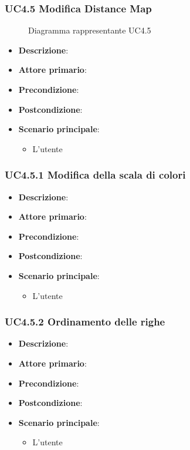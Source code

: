 \newpage
\subsubsection{UC4.5 Modifica Distance Map}
\label{ssub:uc4.5}
\begin{figure}[h]
    \centering
    \caption{Diagramma rappresentante UC4.5}
    \label{fig:UC4.2}
\end{figure}

\begin{itemize}
    \item \textbf{Descrizione}:
    \item \textbf{Attore primario}:
    \item \textbf{Precondizione}:
    \item \textbf{Postcondizione}:
    \item \textbf{Scenario principale}:
    \begin{itemize}
        \item L'utente
    \end{itemize}
\end{itemize}

\subsubsection{UC4.5.1 Modifica della scala di colori}
\label{ssub:uc4.5.1}
\begin{itemize}
    \item \textbf{Descrizione}:
    \item \textbf{Attore primario}:
    \item \textbf{Precondizione}:
    \item \textbf{Postcondizione}:
    \item \textbf{Scenario principale}:
    \begin{itemize}
        \item L'utente
    \end{itemize}
\end{itemize}

\subsubsection{UC4.5.2 Ordinamento delle righe}
\label{ssub:uc4.5.2}
\begin{itemize}
    \item \textbf{Descrizione}:
    \item \textbf{Attore primario}:
    \item \textbf{Precondizione}:
    \item \textbf{Postcondizione}:
    \item \textbf{Scenario principale}:
    \begin{itemize}
        \item L'utente
    \end{itemize}
\end{itemize}

